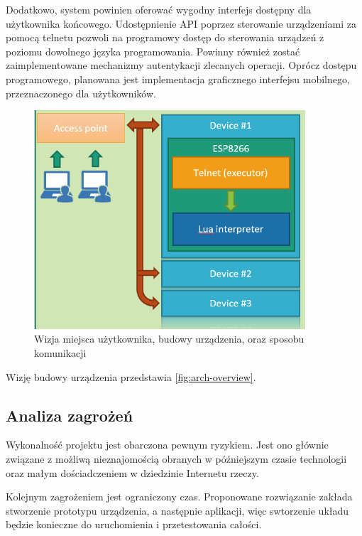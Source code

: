 Dodatkowo, system powinien oferować wygodny interfejs dostępny dla użytkownika końcowego. Udostępnienie API poprzez sterowanie urządzeniami za pomocą telnetu pozwoli na programowy dostęp do sterowania urządzeń z poziomu dowolnego języka programowania. Powinny również zostać zaimplementowane mechanizmy autentykacji zlecanych operacji. Oprócz dostępu programowego, planowana jest implementacja graficznego interfejsu mobilnego, przeznaczonego dla użytkowników\cite{kukdm-art}.

\begin{figure}[!htbp]
	\centering
	\includegraphics[width=0.9\textwidth]{images/fig01-arch-overview.png}
	\caption[Wizja architektury systemu.]{Wizja miejsca użytkownika, budowy urządzenia, oraz sposobu komunikacji}
	\label{fig:arch-overview}
\end{figure}

Wizję budowy urządzenia przedstawia \autoref{fig:arch-overview}.

\subsection{Analiza zagrożeń}
Wykonalność projektu jest obarczona pewnym ryzykiem. Jest ono głównie związane z możliwą nieznajomością obranych w późniejszym czasie technologii oraz małym dościadczeniem w dziedzinie Internetu rzeczy.

Kolejnym zagrożeniem jest ograniczony czas. Proponowane rozwiązanie zakłada stworzenie prototypu urządzenia, a następnie aplikacji, więc swtorzenie układu będzie konieczne do uruchomienia i przetestowania całości.
